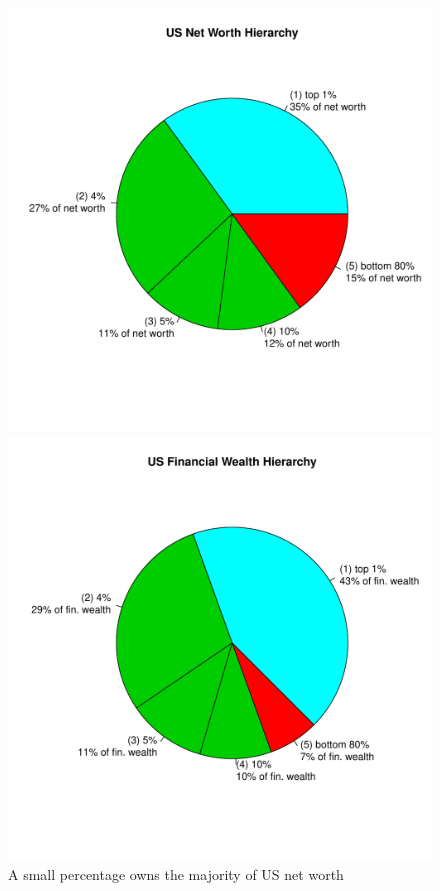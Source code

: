 \documentclass[10pt,oneside]{memoir}
\begin{document}
\begin{Spacing}{2}
\begin{figure}[ht]
    \centering
    \includegraphics[scale=0.5]{figures/us-net-worth-pie}
    \caption{A small percentage owns the majority of US net worth}
    \label{figure:us-net-worth-hierarchy}
\endminipage\hfill%
%
    \centering
    \includegraphics[scale=0.5]{figures/us-fin-wealth-pie-5pm}

\end{figure}
\end{Spacing}
\end{document}
